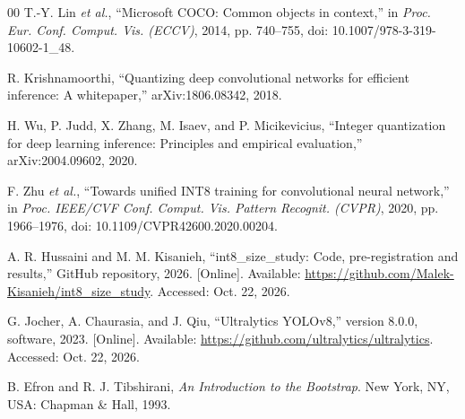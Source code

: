 \documentclass[conference]{IEEEtran}
\begin{document}
\begin{thebibliography}{00}
T.-Y. Lin \textit{et al.}, ``Microsoft COCO: Common objects in context,'' in \textit{Proc. Eur.
Conf. Comput. Vis. (ECCV)}, 2014, pp. 740--755, doi: 10.1007/978-3-319-10602-1\_48.

R. Krishnamoorthi, ``Quantizing deep convolutional networks for efficient inference: A
whitepaper,'' arXiv:1806.08342, 2018.

H. Wu, P. Judd, X. Zhang, M. Isaev, and P. Micikevicius, ``Integer quantization for deep learning
inference: Principles and empirical evaluation,'' arXiv:2004.09602, 2020.

F. Zhu \textit{et al.}, ``Towards unified INT8 training for convolutional neural network,'' in
\textit{Proc. IEEE/CVF Conf. Comput. Vis. Pattern Recognit. (CVPR)}, 2020, pp. 1966--1976,
doi: 10.1109/CVPR42600.2020.00204.

A. R. Hussaini and M. M. Kisanieh, ``int8\_size\_study: Code, pre-registration and results,''
GitHub repository, 2026. [Online]. Available:
\url{https://github.com/Malek-Kisanieh/int8_size_study}. Accessed: Oct. 22, 2026.

G. Jocher, A. Chaurasia, and J. Qiu, ``Ultralytics YOLOv8,'' version 8.0.0, software, 2023.
[Online]. Available: \url{https://github.com/ultralytics/ultralytics}. Accessed: Oct. 22, 2026.

B. Efron and R. J. Tibshirani, \textit{An Introduction to the Bootstrap}. New York, NY, USA:
Chapman \& Hall, 1993.

\end{thebibliography}
\end{document}

